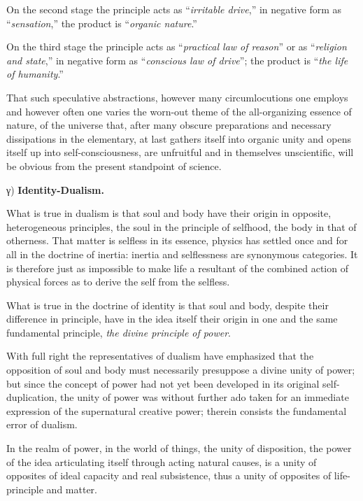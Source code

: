 \documentclass[12pt,a4paper,openany]{book}
\newcommand{\opage}[1]{\marginnote{\footnotesize\textit{[#1]}}}
\begin{document}
On the second stage the principle acts as “\emph{irritable drive},” in negative form as “\emph{sensation},” the product
is “\emph{organic nature}.”

On the third stage the principle acts as “\emph{practical law of reason}” or as “\emph{religion and state},” in negative
form as “\emph{conscious law of drive}”; the product is “\emph{the life of humanity}.”

That such speculative abstractions, however many circumlocutions one employs and however often one varies the worn-out
theme of the all-organizing essence of nature, of the universe that, after many obscure preparations and necessary
dissipations in the elementary, at last gathers itself into organic unity and opens itself up into self-consciousness,
are unfruitful and in themselves unscientific, will be obvious from the present standpoint of science.

\begin{center}γ) \textbf{Identity-Dualism.}\end{center}

What is true in dualism is that soul and body have their origin in opposite, heterogeneous principles, the soul
\opage{5}in the principle of selfhood, the body in that of otherness. That matter is selfless in its essence, physics has
settled once and for all in the doctrine of inertia: inertia and selflessness are synonymous categories. It is therefore
just as impossible to make life a resultant of the combined action of physical forces as to derive the self from the
selfless.

What is true in the doctrine of identity is that soul and body, despite their difference in principle, have in the idea
itself their origin in one and the same fundamental principle, \emph{the divine principle of power}.

With full right the representatives of dualism have emphasized that the opposition of soul and body must necessarily
presuppose a divine unity of power; but since the concept of power had not yet been developed in its original
self-duplication, the unity of power was without further ado taken for an immediate expression of the supernatural
creative power; therein consists the fundamental error of dualism.

In the realm of power, in the world of things, the unity of disposition, the power of the idea articulating itself
through acting natural causes, is a unity of opposites of ideal capacity and real subsistence, thus a unity of opposites
of life-principle and matter.
\end{document}
